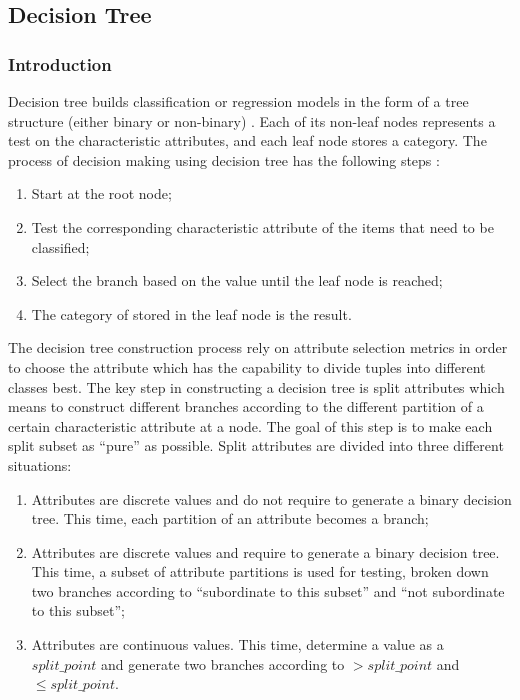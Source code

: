 \documentclass[sigconf]{acmart}
\begin{document}
\subsection{Decision Tree}

\subsubsection{Introduction}

Decision tree builds classification or regression models in the form of a tree structure (either binary or non-binary) \cite{ss.dt}. Each of its non-leaf nodes represents a test on the characteristic attributes, and each leaf node stores a category. The process of decision making using decision tree has the following steps \cite{intro.dm}:
\begin{enumerate}
    \item Start at the root node;
    \item Test the corresponding characteristic attribute of the items that need to be classified;
    \item Select the branch based on the value until the leaf node is reached;
    \item The category of stored in the leaf node is the result.
\end{enumerate}

The decision tree construction process rely on attribute selection metrics in order to choose the attribute which has the capability to divide tuples into different classes best. The key step in constructing a decision tree is split attributes which means to construct different branches according to the different partition of a certain characteristic attribute at a node. The goal of this step is to make each split subset as ``pure'' as possible. Split attributes are divided into three different situations:
\begin{enumerate}
    \item Attributes are discrete values and do not require to generate a binary decision tree. This time, each partition of an attribute becomes a branch;
    \item Attributes are discrete values and require to generate a binary decision tree. This time, a subset of attribute partitions is used for testing, broken down two branches according to ``subordinate to this subset'' and ``not subordinate to this subset'';
    \item Attributes are continuous values. This time, determine a value as a $split\_point$ and generate two branches according to $>split\_point$ and $\leq split\_point$.
\end{enumerate}
\end{document}
